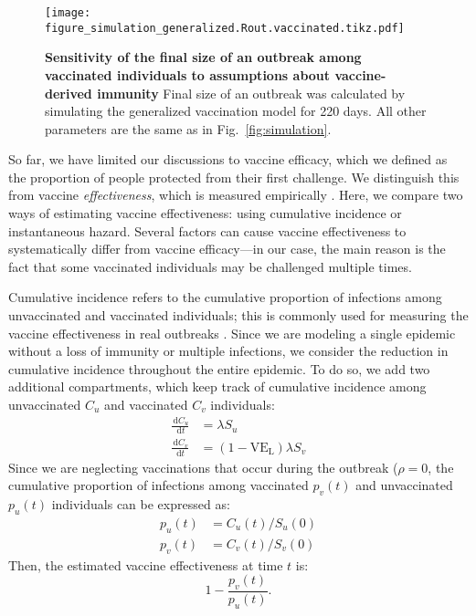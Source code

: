 \documentclass[12pt]{article}
\newcommand{\fref}[1]{Fig.~\ref{fig:#1}}
\newcommand{\dd}[1]{\ensuremath{\, \mathrm{d}#1}}
\newcommand{\VE}{\ensuremath{\mathrm{VE}}}
\newcommand{\VEL}{\ensuremath{\VE_{\mathrm{L}}}}
\begin{document}
\begin{figure}[!th]
\texttt{[image: figure\_simulation\_generalized.Rout.vaccinated.tikz.pdf]}
\caption{
\textbf{Sensitivity of the final size of an outbreak among vaccinated individuals to assumptions about vaccine-derived immunity}
Final size of an outbreak was calculated by simulating the generalized vaccination model for 220 days.
All other parameters are the same as in \fref{simulation}.
\label{fig:sensitivity}
}
\end{figure}

So far, we have limited our discussions to vaccine efficacy, which we defined as the proportion of people protected from their first challenge. 
We distinguish this from vaccine \textit{effectiveness}, which is measured empirically \citep{halloran2009design}. 
Here, we compare two ways of estimating vaccine effectiveness: using cumulative incidence or instantaneous hazard.
Several factors can cause vaccine effectiveness to systematically differ from vaccine efficacy---in our case, the main reason is the fact that some vaccinated individuals may be challenged multiple times.

Cumulative incidence refers to the cumulative proportion of infections among unvaccinated and vaccinated individuals; 
this is commonly used for measuring the vaccine effectiveness in real outbreaks \citep{farrington1993estimation}.
Since we are modeling a single epidemic without a loss of immunity or multiple infections, we consider the reduction in cumulative incidence throughout the entire epidemic.
To do so, we add two additional compartments, which keep track of cumulative incidence among unvaccinated $C_u$ and vaccinated $C_v$ individuals:
\begin{align}
\frac{\dd C_u}{\dd t} &= \lambda S_u\\
\frac{\dd C_v}{\dd t} &= (1-\VEL) \lambda S_v
\end{align}
Since we are neglecting vaccinations that occur during the outbreak ($\rho=0$, the cumulative proportion of infections among vaccinated $p_v(t)$ and unvaccinated $p_u(t)$ individuals can be expressed as:
\begin{align}
p_u(t) &= C_u(t)/S_u(0)\\
p_v(t) &= C_v(t)/S_v(0)
\end{align}
Then, the estimated vaccine effectiveness at time $t$ is:
\begin{equation}
1 - \frac{p_v(t)}{p_u(t)}.
\end{equation}
\end{document}
